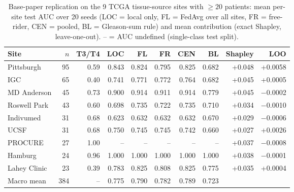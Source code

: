 \begin{table}[t]
\caption{Base-paper replication on the 9 TCGA tissue-source sites with $\geq 20$ patients: mean per-site test AUC over 20 seeds (LOC = local only, FL = FedAvg over all sites, FR = free-rider, CEN = pooled, BL = Gleason-sum rule) and mean contribution (exact Shapley, leave-one-out). -- = AUC undefined (single-class test split).}
\centering\small
\begin{tabular}{lrrrrrrrrr}
\toprule
Site & $n$ & T3/T4 & LOC & FL & FR & CEN & BL & Shapley & LOO \\
\midrule
Pittsburgh & 95 & 0.59 & 0.843 & 0.824 & 0.795 & 0.825 & 0.682 & +0.048 & +0.0058 \\
IGC & 65 & 0.40 & 0.741 & 0.771 & 0.772 & 0.764 & 0.682 & +0.045 & +0.0005 \\
MD Anderson & 45 & 0.73 & 0.900 & 0.914 & 0.911 & 0.914 & 0.779 & +0.045 & \ensuremath{-}0.0002 \\
Roswell Park & 43 & 0.60 & 0.698 & 0.735 & 0.722 & 0.735 & 0.710 & +0.034 & \ensuremath{-}0.0010 \\
Indivumed & 31 & 0.68 & 0.623 & 0.632 & 0.632 & 0.632 & 0.670 & +0.029 & \ensuremath{-}0.0006 \\
UCSF & 31 & 0.68 & 0.750 & 0.745 & 0.745 & 0.742 & 0.660 & +0.027 & +0.0026 \\
PROCURE & 27 & 1.00 & -- & -- & -- & -- & -- & +0.037 & \ensuremath{-}0.0008 \\
Hamburg & 24 & 0.96 & 1.000 & 1.000 & 1.000 & 1.000 & 1.000 & +0.038 & \ensuremath{-}0.0001 \\
Lahey Clinic & 23 & 0.39 & 0.783 & 0.825 & 0.808 & 0.825 & 0.775 & +0.035 & +0.0004 \\
\midrule
Macro mean & 384 & -- & 0.775 & 0.790 & 0.782 & 0.789 & 0.723 & & \\
\bottomrule
\end{tabular}
\label{tab:base_paper}
\end{table}
